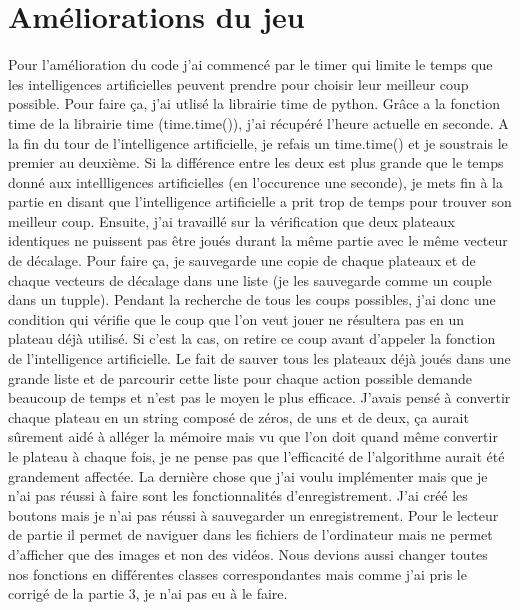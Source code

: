 \documentclass{report}
\begin{document}
\chapter{Améliorations du jeu}
Pour l'amélioration du code j'ai commencé par le timer qui limite le temps que les intelligences artificielles peuvent prendre pour choisir leur meilleur coup possible. Pour faire ça, j'ai utlisé la librairie time de python. Grâce a la fonction time de la librairie time (time.time()), j'ai récupéré l'heure actuelle en seconde. A la fin du tour de l'intelligence artificielle, je refais un time.time() et je soustrais le premier au deuxième. Si la différence entre les deux est plus grande que le temps donné aux intellligences artificielles (en l'occurence une seconde), je mets fin à la partie en disant que l'intelligence artificielle a prit trop de temps pour trouver son meilleur coup.
\newline Ensuite, j'ai travaillé sur la vérification que deux plateaux identiques ne puissent pas être joués durant la même partie avec le même vecteur de décalage. Pour faire ça, je sauvegarde une copie de chaque plateaux et de chaque vecteurs de décalage dans une liste (je les sauvegarde comme un couple dans un tupple). Pendant la recherche de tous les coups possibles, j'ai donc une condition qui vérifie que le coup que l'on veut jouer ne résultera pas en un plateau déjà utilisé. Si c'est la cas, on retire ce coup avant d'appeler la fonction de l'intelligence artificielle. Le fait de sauver tous les plateaux déjà joués dans une grande liste et de parcourir cette liste pour chaque action possible demande beaucoup de temps et n'est pas le moyen le plus efficace. J'avais pensé à convertir chaque plateau en un string composé de zéros, de uns et de deux, ça aurait sûrement aidé à alléger la mémoire mais vu que l'on doit quand même convertir le plateau à chaque fois, je ne pense pas que l'efficacité de l'algorithme aurait été grandement affectée.
\newline La dernière chose que j'ai voulu implémenter mais que je n'ai pas réussi à faire sont les fonctionnalités d'enregistrement. J'ai créé les boutons mais je n'ai pas réussi à sauvegarder un enregistrement. Pour le lecteur de partie il permet de naviguer dans les fichiers de l'ordinateur mais ne permet d'afficher que des images et non des vidéos.
\newline Nous devions aussi changer toutes nos fonctions en différentes classes correspondantes mais comme j'ai pris le corrigé de la partie 3, je n'ai pas eu à le faire.
\end{document}
